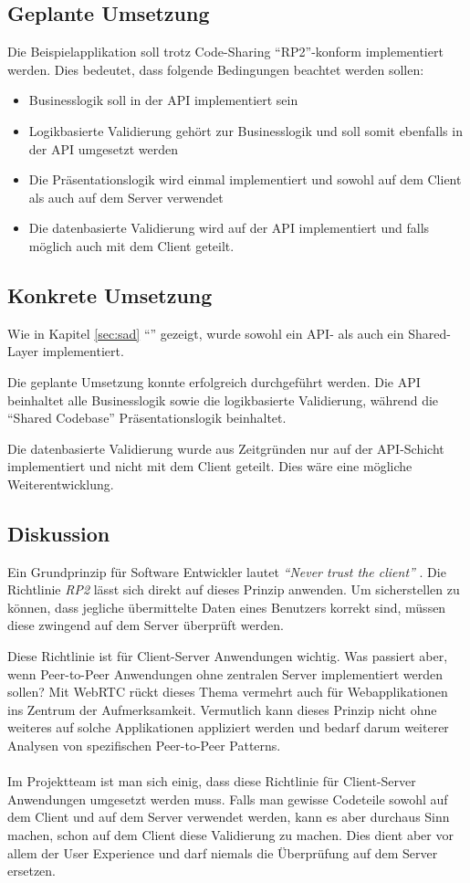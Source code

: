 \subsection*{Geplante Umsetzung}
Die Beispielapplikation soll trotz Code-Sharing ``RP2''-konform implementiert werden. Dies bedeutet, dass folgende Bedingungen beachtet werden sollen:
\begin{itemize}
	\item Businesslogik soll in der API implementiert sein
	\item Logikbasierte Validierung gehört zur Businesslogik und soll somit ebenfalls in der API umgesetzt werden
	\item Die Präsentationslogik wird einmal implementiert und sowohl auf dem Client als auch auf dem Server verwendet
	\item Die datenbasierte Validierung wird auf der API implementiert und falls möglich auch mit dem Client geteilt.
\end{itemize}

\subsection*{Konkrete Umsetzung}
Wie in Kapitel \ref{sec:sad} ``'' gezeigt, wurde sowohl ein API- als auch ein Shared-Layer implementiert.

Die geplante Umsetzung konnte erfolgreich durchgeführt werden. Die API beinhaltet alle Businesslogik sowie die logikbasierte Validierung, während die ``Shared Codebase'' Präsentationslogik beinhaltet.

Die datenbasierte Validierung wurde aus Zeitgründen nur auf der API-Schicht implementiert und nicht mit dem Client geteilt. Dies wäre eine mögliche Weiterentwicklung.

\subsection*{Diskussion}
Ein Grundprinzip für Software Entwickler lautet \emph{``Never trust the client''} \cite{DefensiveProgramming}. Die Richtlinie \emph{RP2} lässt sich direkt auf dieses Prinzip anwenden.
Um sicherstellen zu können, dass jegliche übermittelte Daten eines Benutzers korrekt sind, müssen diese zwingend auf dem Server überprüft werden.

Diese Richtlinie ist für Client-Server Anwendungen wichtig. Was passiert aber, wenn Peer-to-Peer Anwendungen ohne zentralen Server implementiert werden sollen? Mit \mbox{\gls{WebRTC}} \cite{WebRTC} rückt dieses Thema vermehrt auch für Webapplikationen ins Zentrum der Aufmerksamkeit. Vermutlich kann dieses Prinzip nicht ohne weiteres auf solche Applikationen appliziert werden und bedarf darum weiterer Analysen von spezifischen Peer-to-Peer Patterns.
\\ \\
Im Projektteam ist man sich einig, dass diese Richtlinie für Client-Server Anwendungen umgesetzt werden muss. Falls man gewisse Codeteile sowohl auf dem Client und auf dem Server verwendet werden, kann es aber durchaus Sinn machen, schon auf dem Client diese Validierung zu machen. Dies dient aber vor allem der User Experience und darf niemals die Überprüfung auf dem Server ersetzen.
